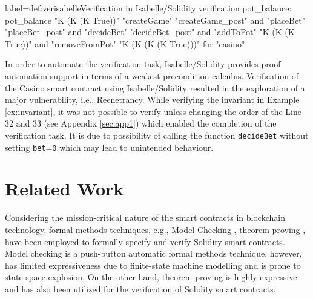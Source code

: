 \documentclass[a4paper,UKenglish,cleveref, autoref, thm-restate]{oasics-v2021}
\begin{document}
\begin{code}{label={def:ver}}{isabelle}{Verification in Isabelle/Solidity}
verification pot_balance:
   pot_balance
  "K (K (K True))"
  "createGame" "createGame_post" and
  "placeBet" "placeBet_post" and
  "decideBet" "decideBet_post" and
  "addToPot" "K (K (K True))" and
  "removeFromPot" "K (K (K (K True)))"
  for "casino"
\end{code}
In order to automate the verification task, Isabelle/Solidity provides proof automation support in terms of a weakest precondition calculus.
Verification of the Casino smart contract using Isabelle/Solidity resulted in the exploration of a major vulnerability, i.e., Reenetrancy.
%
While verifying the invariant in Example \autoref{ex:invariant},  it was not possible to verify unless changing the order of the Line 32 and 33 (see Appendix \ref{sec:app1}) which enabled the completion of the verification task. 
%
It is due to possibility of calling the function \texttt{decideBet} without setting \texttt{bet}=\texttt{0} which may lead to unintended behaviour.  
%

\section{Related Work}
%
Considering the mission-critical nature of the smart contracts in blockchain technology, formal methods techniques, e.g., Model Checking \cite{antonino2020formalising}, theorem proving \cite{bhargavan2016formal}, have been employed to formally specify and verify Solidity smart contracts. Model checking \cite{clarke1997model}is a push-button automatic formal methods technique, however, has limited expressiveness due to finite-state machine modelling and is prone to state-space explosion. On the other hand, theorem proving is highly-expressive and has also been utilized for the verification of Solidity smart contracts. 
\end{document}

